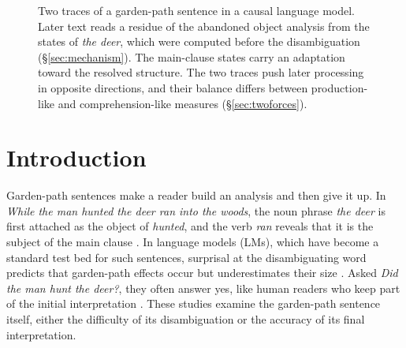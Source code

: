 \documentclass[11pt]{article}
\newcommand{\ex}[1]{\textit{#1}}
\begin{document}
\begin{figure}[t]
\centering
{}
\caption{Two traces of a garden-path sentence in a causal language model.
Later text reads a residue of the abandoned object analysis from the states of \ex{the deer}, which were computed before the disambiguation (\S\ref{sec:mechanism}).
The main-clause states carry an adaptation toward the resolved structure.
The two traces push later processing in opposite directions, and their balance differs between production-like and comprehension-like measures (\S\ref{sec:twoforces}).}
\label{fig:schema}
\end{figure}

\section{Introduction}

Garden-path sentences make a reader build an analysis and then give it up.
In \ex{While the man hunted the deer ran into the woods}, the noun phrase \ex{the deer} is first attached as the object of \ex{hunted}, and the verb \ex{ran} reveals that it is the subject of the main clause \citep{frazier1982}.
In language models (LMs), which have become a standard test bed for such sentences, surprisal at the disambiguating word predicts that garden-path effects occur but underestimates their size \citep{futrell2019,vanschijndel2021,arehalli2022,huang2024}.
Asked \ex{Did the man hunt the deer?}, they often answer yes, like human readers who keep part of the initial interpretation \citep{christianson2001,li2024incremental,amouyal2025}.
These studies examine the garden-path sentence itself, either the difficulty of its disambiguation or the accuracy of its final interpretation.
\end{document}
